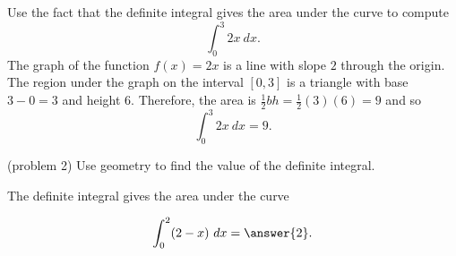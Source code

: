 \documentclass[handout]{ximera}
\begin{document}
\begin{example}[example 2]
Use the fact that the definite integral gives the area under the curve to compute
\[\int_0^3 2x \ dx.\]
The graph of the function $f(x) = 2x$ is a line with slope $2$ through the origin. 
The region under the graph on the interval $[0,3]$ is a triangle with base $3-0 = 3$ and height $6$. 
Therefore, the area is $\frac12 bh = \frac12(3)(6) = 9$ and so
\[\int_0^3 2x \ dx =9.\]


\begin{image}
\end{image}

\end{example}

\begin{problem}(problem 2)
Use geometry to find the value of the definite integral.
\begin{hint}
The definite integral gives the area under the curve
\end{hint}
\[\int_{0}^{2} (2-x) \ dx = \answer{2}.\]
\end{problem}
\end{document}
